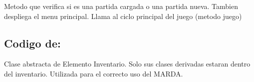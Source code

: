 \documentclass[letterpaper,10pt,english]{sphinxmanual}
\begin{document}

\begin{fulllineitems}
\label{\detokenize{codigo:controlador.run}}
Metodo que verifica si es una partida cargada o una partida nueva. Tambien despliega el
menu principal. Llama al ciclo principal del juego (metodo juego)

\end{fulllineitems}



\subsection{Codigo de: }
\label{\detokenize{codigo:module-inventario}}\label{\detokenize{codigo:codigo-de-inventario}}

\begin{fulllineitems}
\label{\detokenize{codigo:inventario.ElementoInventario}}
Clase abstracta de Elemento Inventario. Solo sus clases derivadas estaran
dentro del inventario. Utilizada para el correcto uso del MARDA.

\end{fulllineitems}

\end{document}
